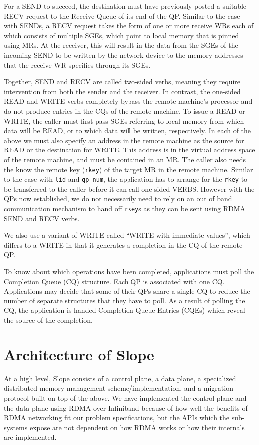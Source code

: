 For a SEND to succeed, the destination must have previously posted a suitable
RECV request to the Receive Queue of its end of the QP. Similar to the case with SENDs,
a RECV request takes the form of one or more receive WRs each of which
consists of multiple SGEs, which point to local memory that is pinned using
MRs. At the receiver, this will result in the data from the SGEs of the incoming
SEND to be written by the network device to the memory addresses that the
receive WR specifies through its SGEs.

Together, SEND and RECV are called two-sided verbs, meaning they require
intervention from both the sender and the receiver. In contrast, the one-sided
READ and WRITE verbs completely bypass the remote machine's processor and do not
produce entries in the CQs of the remote machine. To
issue a READ or WRITE, the caller must first pass SGEs referring to local memory
from which data will be READ, or to which data will be written, respectively.
In each of the above we must also specify an address in the remote machine
as the source for READ or the destination for WRITE. This address is in
the virtual address space of the remote machine, and must be contained in an
MR. The caller also needs the know the remote key (\texttt{rkey}) of the target
MR in the remote machine. Similar to the case with \texttt{lid} and
\texttt{qp\_num}, the application has to arrange for the \texttt{rkey} to be
transferred to the caller before it can call one sided VERBS. However with the
QPs now established, we do not necessarily need to rely on an out of band
communication mechanism to hand off \texttt{rkey}s as they can be sent using
RDMA SEND and RECV verbs.

We also use a variant of WRITE called ``WRITE with immediate values'', which
differs to a WRITE in that it generates a completion in the CQ of the
remote QP.

To know about which operations have been completed, applications must poll the
Completion Queue (CQ) structure.
Each QP is associated with one CQ. Applications may decide that some of their
QPs share a single CQ to reduce the number of separate structures that they
have to poll. As a result of polling the CQ, the application is handed
Completion Queue Entries (CQEs) which reveal the source of the completion.


\section{Architecture of Slope}
At a high level, Slope consists of  a control plane, a data plane,
a specialized distributed memory management
scheme/implementation, and a migration protocol
built on top
of the above. We have implemented the control plane and the data plane using
RDMA over Infiniband because of how well the benefits of RDMA networking
fit our problem specifications, but the APIs which the 
sub-systems expose are not dependent on how RDMA works or how their internals
are implemented.




